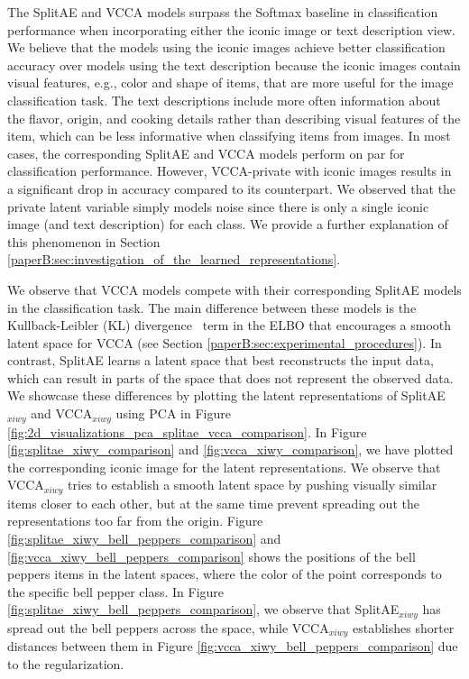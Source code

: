 The SplitAE and VCCA models surpass the Softmax baseline in classification performance when incorporating either the iconic image or text description view. 
We believe that the models using the iconic images achieve better classification accuracy over models using the text description because the iconic images contain visual features, e.g., color and shape of items, that are more useful for the image classification task. The text descriptions include more often information about the flavor, origin, and cooking details rather than describing visual features of the item, which can be less informative when classifying items from images. In most cases, the corresponding SplitAE and VCCA models perform on par for classification performance. However, VCCA-private with iconic images results in a significant drop in accuracy compared to its counterpart. We observed that the private latent variable simply models noise since there is only a single iconic image (and text description) for each class. We provide a further explanation of this phenomenon in Section \ref{paperB:sec:investigation_of_the_learned_representations}. 



We observe that VCCA models compete with their corresponding SplitAE models in the classification task. The main difference between these models is the Kullback-Leibler (KL) divergence~ term in the ELBO that encourages a smooth latent space for VCCA (see Section \ref{paperB:sec:experimental_procedures}). %
In contrast, SplitAE learns a latent space that best reconstructs the input data, which can result in parts of the space that does not represent the observed data. We showcase these differences by plotting the latent representations of SplitAE$_{x i w y}$ and VCCA$_{x i w y}$ using PCA in Figure \ref{fig:2d_visualizations_pca_splitae_vcca_comparison}. In Figure \ref{fig:splitae_xiwy_comparison} and \ref{fig:vcca_xiwy_comparison}, we have plotted the corresponding iconic image for the latent representations. We observe that VCCA$_{x i w y}$ tries to establish a smooth latent space by pushing visually similar items closer to each other, but at the same time prevent spreading out the representations too far from the origin. Figure \ref{fig:splitae_xiwy_bell_peppers_comparison} and \ref{fig:vcca_xiwy_bell_peppers_comparison} shows the positions of the bell peppers items in the latent spaces, where the color of the point corresponds to the specific bell pepper class. In Figure \ref{fig:splitae_xiwy_bell_peppers_comparison}, we observe that SplitAE$_{x i w y}$ has spread out the bell peppers across the space, while VCCA$_{x i w y}$ establishes shorter distances between them in Figure \ref{fig:vcca_xiwy_bell_peppers_comparison} due to the regularization.


